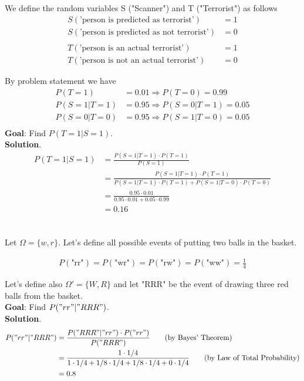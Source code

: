 \documentclass[11pt]{article}
\newcommand{\exercise}{\section{}}
\begin{document}
\exercise

We define the random variables S ("Scanner") and T ("Terrorist") as follows
\begin{align*}
S(\text{'person is predicted as terrorist'}) &= 1 \\
S(\text{'person is predicted as not terrorist'}) &= 0 \\
\\
T(\text{'person is an actual terrorist'}) &= 1 \\
T(\text{'person is not an actual terrorist'}) &= 0
\end{align*}

\noindent By problem statement we have
\begin{align*}
P(T = 1) &= 0.01 \Rightarrow P(T = 0) = 0.99 \\
P(S = 1 | T = 1) &= 0.95 \Rightarrow P(S = 0 | T = 1) = 0.05 \\
P(S = 0 | T = 0) &= 0.95 \Rightarrow P(S = 1 | T = 0) = 0.05 \\
\end{align*}
\textbf{Goal}: Find $P(T = 1 | S = 1)$. \\
\textbf{Solution}.
\begin{align*}
P(T = 1 | S = 1) &= \frac{P(S=1 | T=1) \cdot P(T = 1)}{P(S = 1)} \tag{by Bayes' Theorem} \\
&= \frac{P(S=1 | T=1) \cdot P(T=1)}{P(S=1 | T=1) \cdot P(T=1) + P(S=1 | T=0) \cdot P(T = 0)} \tag{by Law of Total Probability} \\
&= \frac{0.95 \cdot 0.01}{0.95 \cdot 0.01 + 0.05 \cdot 0.99 } \\
&= 0.16
\end{align*}


\exercise

Let $\Omega = \{w, r\}$. Let's define all possible events of putting two balls in the basket. 

\begin{align*}
P(\text{"rr"}) = P(\text{"wr"}) = P(\text{"rw"}) = P(\text{"ww"}) = \frac{1}{4}
\end{align*}

\noindent  Let's define also $\Omega' = \{W, R\}$ and let "RRR" be the event of drawing three red balls from the basket. \\
\textbf{Goal}: Find $P( "rr" | "RRR")$. \\
\textbf{Solution}.
\begin{align*}
P("rr" | "RRR") &= \frac{P("RRR" | "rr" ) \cdot P("rr")}{P("RRR")} \tag{by Bayes' Theorem} \\
&= \frac{1 \cdot 1/4}{1 \cdot 1/4 + 1/8 \cdot 1/4 + 1/8 \cdot 1/4 + 0 \cdot 1/4} \tag{by Law of Total Probability} \\
&= 0.8
\end{align*}
\end{document}
